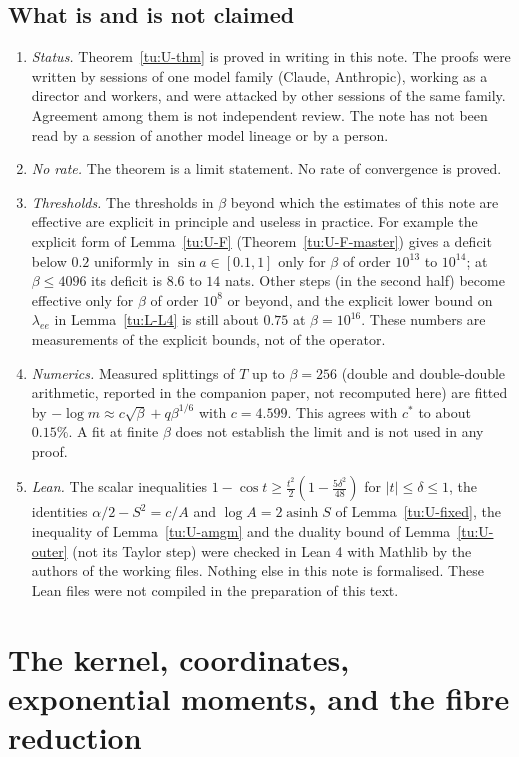\subsection{What is and is not claimed}\label{tu:U-sec-status}
\begin{enumerate}
\item \emph{Status.} Theorem~\ref{tu:U-thm} is proved in writing in this note. The proofs were written
by sessions of one model family (Claude, Anthropic), working as a director and workers, and were
attacked by other sessions of the same family. Agreement among them is not independent review. The
note has not been read by a session of another model lineage or by a person.
\item \emph{No rate.} The theorem is a limit statement. No rate of convergence is proved.
\item \emph{Thresholds.} The thresholds in $\beta$ beyond which the estimates of this note are
effective are explicit in principle and useless in practice. For example the explicit form of
Lemma~\ref{tu:U-F} (Theorem~\ref{tu:U-F-master}) gives a deficit below $0.2$ uniformly in
$\sin a\in[0.1,1]$ only for $\beta$ of order $10^{13}$ to $10^{14}$; at $\beta\le4096$ its deficit is $8.6$
to $14$ nats. Other steps (in the second half) become effective only for $\beta$ of order $10^{8}$ or
beyond, and the explicit lower bound on $\lambda_{ee}$ in Lemma~\ref{tu:L-L4} is still about $0.75$ at
$\beta=10^{16}$. These numbers are measurements of the explicit bounds, not of the operator.
\item \emph{Numerics.} Measured splittings of $T$ up to $\beta=256$ (double and double-double
arithmetic, reported in the companion paper, not recomputed here) are fitted by
$-\log m\approx c\sqrt\beta+q\beta^{1/6}$ with $c=4.599$. This agrees with $c^*$ to about
$0.15\%$. A fit at finite $\beta$ does not establish the limit and is not used in any proof.
\item \emph{Lean.} The scalar inequalities $1-\cos t\ge\frac{t^2}{2}(1-\frac{5\delta^2}{48})$ for
$|t|\le\delta\le1$, the identities $\alpha/2-S^2=c/A$ and $\log A=2\operatorname{asinh}S$ of
Lemma~\ref{tu:U-fixed}, the inequality of Lemma~\ref{tu:U-amgm} and the duality bound of
Lemma~\ref{tu:U-outer} (not its Taylor step) were checked in Lean 4 with Mathlib by the authors of the
working files. Nothing else in this note is formalised. These Lean files were not compiled in the
preparation of this text.
\end{enumerate}

\section{The kernel, coordinates, exponential moments, and the fibre reduction}\label{tu:U-sec-kernel}

